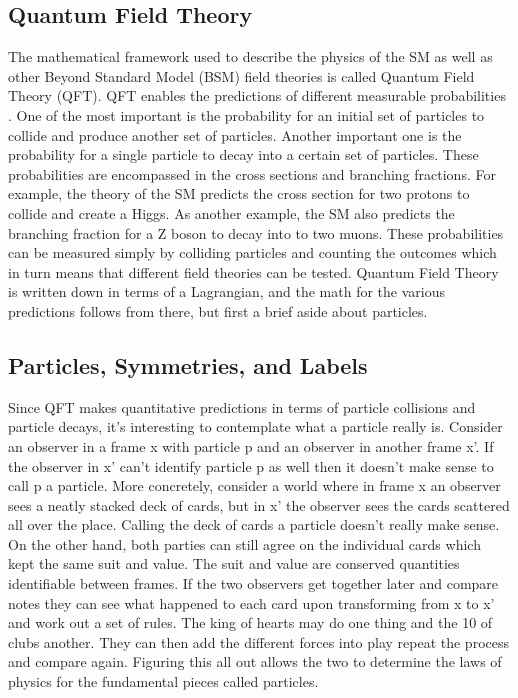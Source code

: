 \documentclass[12pt]{article}
\begin{document}
\subsection{Quantum Field Theory}

The mathematical framework used to describe the physics of the SM as well as other Beyond Standard Model (BSM) field theories is called Quantum Field Theory (QFT). QFT enables the predictions of different measurable probabilities \cite{peskin}. One of the most important is the probability for an initial set of particles to collide and produce another set of particles. Another important one is the probability for a single particle to decay into a certain set of particles. These probabilities are encompassed in the cross sections and branching fractions. For example, the theory of the SM predicts the cross section for two protons to collide and create a Higgs. As another example, the SM also predicts the branching fraction for a Z boson to decay into to two muons. These probabilities can be measured simply by colliding particles and counting the outcomes which in turn means that different field theories can be tested. Quantum Field Theory is written down in terms of a Lagrangian, and the math for the various predictions follows from there, but first a brief aside about particles. 

\subsection{Particles, Symmetries, and Labels}

Since QFT makes quantitative predictions in terms of particle collisions and particle decays, it's interesting to contemplate what a particle really is. Consider an observer in a frame x with particle p and an observer in another frame x'. If the observer in x' can't identify particle p as well then it doesn't make sense to call p a particle. More concretely, consider a world where in frame x an observer sees a neatly stacked deck of cards, but in x' the observer sees the cards scattered all over the place. Calling the deck of cards a particle doesn't really make sense. On the other hand, both parties can still agree on the individual cards which kept the same suit and value. The suit and value are conserved quantities identifiable between frames. If the two observers get together later and compare notes they can see what happened to each card upon transforming from x to x' and work out a set of rules. The king of hearts may do one thing and the 10 of clubs another. They can then add the different forces into play repeat the process and compare again. Figuring this all out allows the two to determine the laws of physics for the fundamental pieces called particles.       
\end{document}
